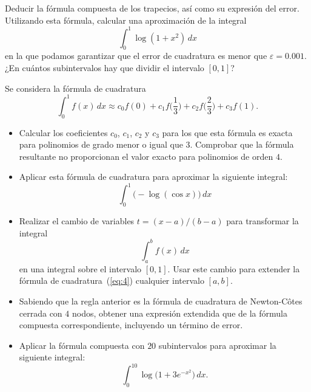 \begin{EjerciciosPropuestos}
  \begin{problema}
    Deducir la fórmula compuesta de los trapecios, así como su
    expresión del error. Utilizando esta fórmula, calcular una
    aproximación de la integral
    $$
    \int_0^1 \log(1+x^2)\, dx
    $$
    en la que podamos garantizar que el error de cuadratura es menor que
    $\varepsilon=0.001$. ¿En cuántos subintervalos hay que dividir el
    intervalo $[0,1]$?
  \item Se considera la fórmula de cuadratura
    \begin{equation}
      \label{eq:4}
      \int_0^1 f(x)\,dx \approx c_0 f(0) + c_1 f\bigg(\frac{1}{3}\bigg)
      + c_2 f\bigg(\frac{2}{3}\bigg) + c_3 f(1).
    \end{equation}
    \begin{itemize}
    \item Calcular los coeficientes $c_0$, $c_1$, $c_2$ y $c_3$ para
      los que esta fórmula es exacta para polinomios de grado menor o
      igual que $3$. Comprobar que la fórmula resultante no
      proporcionan el valor exacto para polinomios de orden $4$.
    \item Aplicar esta fórmula de cuadratura para aproximar la
      siguiente integral:
      \begin{equation*}
        \int_0^1 \big(-\log(\cos x) \big)\,dx
      \end{equation*}
    \item Realizar el cambio de variables $t=(x-a)/(b-a)$ para
      transformar la integral
      \begin{equation*}
        \int_a^b f(x)\, dx
      \end{equation*}
      en una integral sobre el intervalo $[0,1]$. Usar este cambio
      para extender la fórmula de cuadratura~(\ref{eq:4})
       cualquier intervalo $[a,b]$.
     \item Sabiendo que la regla anterior es la fórmula de cuadratura
       de Newton-Côtes cerrada con $4$ nodos, obtener una expresión
       extendida que de la fórmula compuesta correspondiente,
       incluyendo un término de error.
    \item Aplicar la fórmula compuesta con $20$ subintervalos para
      aproximar la siguiente integral:
      \begin{equation*}
        \int_0^{10} \log\big(1+3e^{-x^2}\big)\,dx.
      \end{equation*}
    \end{itemize}
  \end{problema}


\end{EjerciciosPropuestos}
